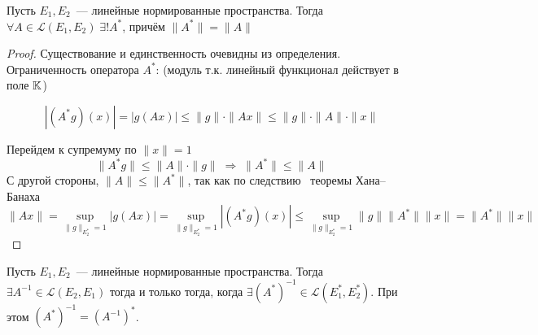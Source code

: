 \begin{theorem}[9.1]
    Пусть $E_1, E_2$~--- линейные нормированные пространства. Тогда $\forall A \in \mathcal{L}(E_1, E_2) \; \exists ! A^*$, причём $\| A^* \| =\| A\|$
\end{theorem}
\begin{proof}
    Существование и единственность очевидны из определения.
    Ограниченность оператора $A^*$: (модуль т.к. линейный функционал действует в поле $\mathbb{K}$)

    \[
    |(A^*g)(x)| = |g(Ax)| \leqslant \|g\| \cdot \|Ax\| \leqslant
    \|g\| \cdot \|A\| \cdot \|x\|
    \]

    Перейдем к супремуму по $\|x\|=1$
    \[
    \|A^* g\| \leqslant \|A\|  \cdot \|g\|  \; \Rightarrow \;
    \|A^*\| \leqslant \|A\|
    \]
    С другой стороны, $\|A\| \leqslant \|A^*\|$, так как по следствию~ теоремы Хана--Банаха
    \[ \| Ax\| = \sup_{\|g\|_{E_2^*} = 1} |g(Ax)| = 
    \sup_{\|g\|_{E_2^*}=1} |(A^*g)(x)| \leqslant  \sup_{\|g\|_{E_2^*}=1} \|g\|  \|A^*\| \|x\| = \|A^*\| \|x\| \]
\end{proof}

\begin{unnecessary}
    \begin{theorem}[9.3 (б/д)]
    Пусть $E_1, E_2$~--- линейные нормированные пространства. Тогда
    $\exists A^{-1} \in \mathcal{L}(E_2, E_1)$ тогда и только тогда, когда
    $\exists (A^*)^{-1} \in \mathcal{L}(E_1^*, E_2^*)$.
    При этом $(A^*)^{-1} = (A^{-1})^*$.
    \end{theorem}
\end{unnecessary}

